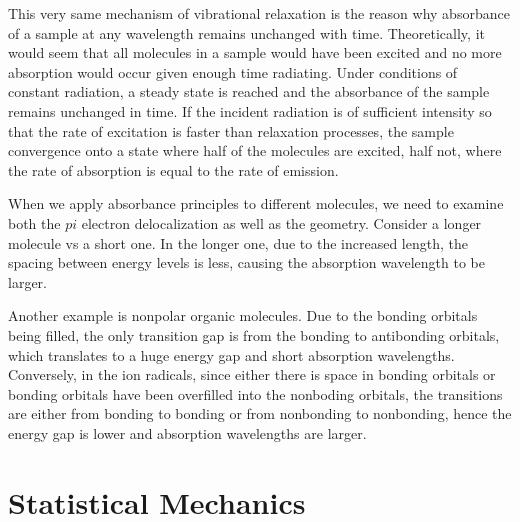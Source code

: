 \documentclass[11pt,fleqn]{book}
\begin{document}
This very same mechanism of vibrational relaxation is the reason why absorbance of a sample at any wavelength remains unchanged with time. Theoretically, it would seem that all molecules in a sample would have been excited and no more absorption would occur given enough time radiating. Under conditions of constant radiation, a steady state is reached and the absorbance of the sample remains unchanged in time. If the incident radiation is of sufficient intensity so that the rate of excitation is faster than relaxation processes, the sample convergence onto a state where half of the molecules are excited, half not, where the rate of absorption is equal to the rate of emission.

When we apply absorbance principles to different molecules, we need to examine both the $pi$ electron delocalization as well as the geometry. Consider a longer molecule vs a short one. In the longer one, due to the increased length, the spacing between energy levels is less, causing the absorption wavelength to be larger.

Another example is nonpolar organic molecules. Due to the bonding orbitals being filled, the only transition gap is from the bonding to antibonding orbitals, which translates to a huge energy gap and short absorption wavelengths. Conversely, in the ion radicals, since either there is space in bonding orbitals or bonding orbitals have been overfilled into the nonboding orbitals, the transitions are either from bonding to bonding or from nonbonding to nonbonding, hence the energy gap is lower and absorption wavelengths are larger.

\chapter{Statistical Mechanics}







\end{document}
